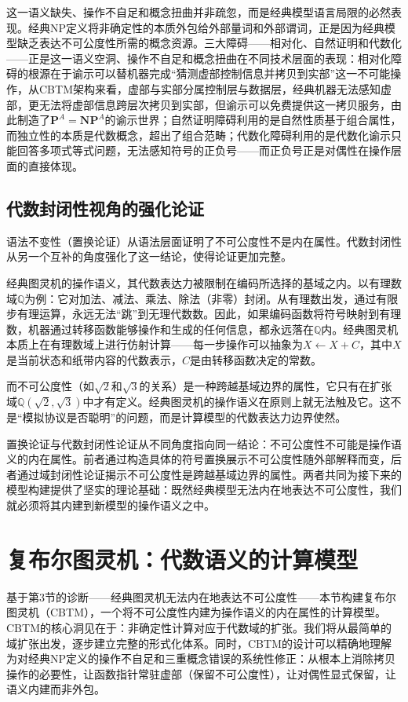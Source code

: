\documentclass{ctexart}
\begin{document}
	这一语义缺失、操作不自足和概念扭曲并非疏忽，而是经典模型语言局限的必然表现。经典NP定义将非确定性的本质外包给外部量词和外部谓词，正是因为经典模型缺乏表达不可公度性所需的概念资源。三大障碍——相对化、自然证明和代数化——正是这一语义空洞、操作不自足和概念扭曲在不同技术层面的表现：相对化障碍的根源在于谕示可以替机器完成“猜测虚部控制信息并拷贝到实部”这一不可能操作，从CBTM架构来看，虚部与实部分属控制层与数据层，经典机器无法感知虚部，更无法将虚部信息跨层次拷贝到实部，但谕示可以免费提供这一拷贝服务，由此制造了$\mathbf{P}^A = \mathbf{NP}^A$的谕示世界；自然证明障碍利用的是自然性质基于组合属性，而独立性的本质是代数概念，超出了组合范畴；代数化障碍利用的是代数化谕示只能回答多项式等式问题，无法感知符号的正负号——而正负号正是对偶性在操作层面的直接体现。
	
	\subsection{代数封闭性视角的强化论证}
	
	语法不变性（置换论证）从语法层面证明了不可公度性不是内在属性。代数封闭性从另一个互补的角度强化了这一结论，使得论证更加完整。
	
	经典图灵机的操作语义，其代数表达力被限制在编码所选择的基域之内。以有理数域$\mathbb{Q}$为例：它对加法、减法、乘法、除法（非零）封闭。从有理数出发，通过有限步有理运算，永远无法``跳''到无理代数数。因此，如果编码函数将符号映射到有理数，机器通过转移函数能够操作和生成的任何信息，都永远落在$\mathbb{Q}$内。经典图灵机本质上在有理数域上进行仿射计算——每一步操作可以抽象为$X \leftarrow X + C$，其中$X$是当前状态和纸带内容的代数表示，$C$是由转移函数决定的常数。
	
	而不可公度性（如$\sqrt{2}$和$\sqrt{3}$的关系）是一种跨越基域边界的属性，它只有在扩张域$\mathbb{Q}(\sqrt{2}, \sqrt{3})$中才有定义。经典图灵机的操作语义在原则上就无法触及它。这不是``模拟协议是否聪明''的问题，而是计算模型的代数表达力边界使然。
	
	置换论证与代数封闭性论证从不同角度指向同一结论：不可公度性不可能是操作语义的内在属性。前者通过构造具体的符号置换展示不可公度性随外部解释而变，后者通过域封闭性论证揭示不可公度性是跨越基域边界的属性。两者共同为接下来的模型构建提供了坚实的理论基础：既然经典模型无法内在地表达不可公度性，我们就必须将其内建到新模型的操作语义之中。
	
	\section{复布尔图灵机：代数语义的计算模型}
	
	基于第3节的诊断——经典图灵机无法内在地表达不可公度性——本节构建复布尔图灵机（CBTM），一个将不可公度性内建为操作语义的内在属性的计算模型。CBTM的核心洞见在于：非确定性计算对应于代数域的扩张。我们将从最简单的域扩张出发，逐步建立完整的形式化体系。同时，CBTM的设计可以精确地理解为对经典NP定义的操作不自足和三重概念错误的系统性修正：从根本上消除拷贝操作的必要性，让函数指针常驻虚部（保留不可公度性），让对偶性显式保留，让语义内建而非外包。
	
\end{document}
